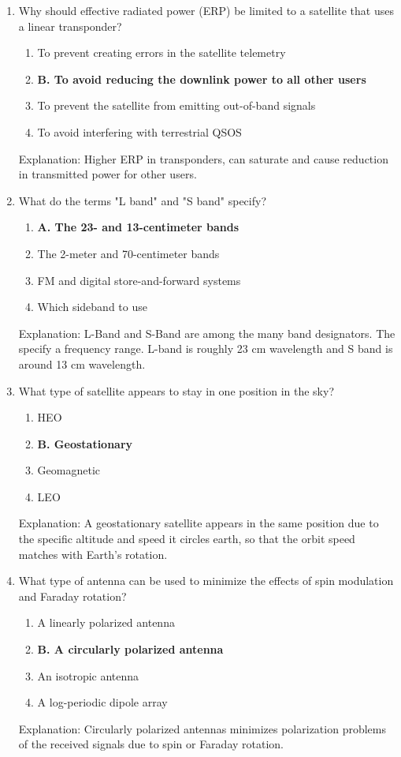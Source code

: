 \begin{enumerate}
         \item Why should effective radiated power (ERP) be limited to a satellite that uses a linear transponder?
    \begin{enumerate}
      \item  To prevent creating errors in the satellite telemetry
       \item \textbf{B. To avoid reducing the downlink power to all other users}
       \item  To prevent the satellite from emitting out-of-band signals
        \item  To avoid interfering with terrestrial QSOS
     \end{enumerate}
   \textcolor{myred}{Explanation:}
   Higher ERP in transponders, can saturate and cause reduction in transmitted power for other users.

   \item What do the terms "L band" and "S band" specify?
      \begin{enumerate}
      \item \textbf{A. The 23- and 13-centimeter bands}
        \item  The 2-meter and 70-centimeter bands
        \item  FM and digital store-and-forward systems
         \item  Which sideband to use
      \end{enumerate}
        \textcolor{myred}{Explanation:}
   L-Band and S-Band are among the many band designators. The specify a frequency range. L-band is roughly 23 cm wavelength and S band is around 13 cm wavelength.
         
          \item What type of satellite appears to stay in one position in the sky?
    \begin{enumerate}
        \item  HEO
         \item \textbf{B. Geostationary}
         \item  Geomagnetic
          \item  LEO
     \end{enumerate}
     \textcolor{myred}{Explanation:}
        A geostationary satellite appears in the same position due to the specific altitude and speed it circles earth, so that the orbit speed matches with Earth's rotation.

  \item What type of antenna can be used to minimize the effects of spin modulation and Faraday rotation?
        \begin{enumerate}
        \item  A linearly polarized antenna
      \item \textbf{B. A circularly polarized antenna}
        \item  An isotropic antenna
       \item  A log-periodic dipole array
     \end{enumerate}
       \textcolor{myred}{Explanation:}
        Circularly polarized antennas minimizes polarization problems of the received signals due to spin or Faraday rotation.
      

\end{enumerate}
